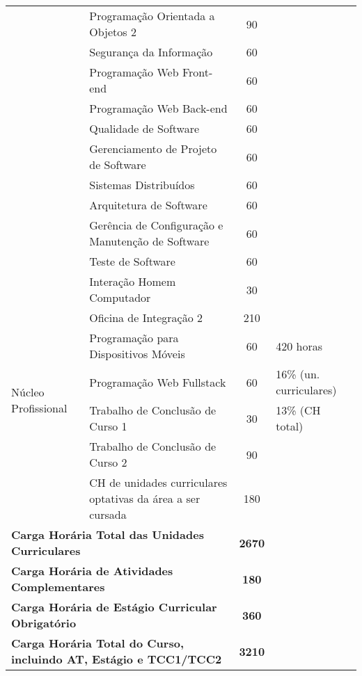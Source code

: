 \begin{quadro}[ht!]
\begin{tabular}{|l|l|c|p{3.2cm}|}
\cline{2-3} & Programação Orientada a Objetos 2 & 90 & \\
\cline{2-3} & Segurança da Informação & 60 & \\
\cline{2-3} & Programação Web Front-end & 60 & \\
\cline{2-3} & Programação Web Back-end & 60 & \\
\cline{2-3} & Qualidade de Software & 60 & \\
\cline{2-3} & Gerenciamento de Projeto de Software & 60 & \\
\cline{2-3} & Sistemas Distribuídos & 60 & \\
\cline{2-3} & Arquitetura de Software & 60 & \\
\cline{2-3} & Gerência de Configuração e Manutenção de Software & 60 & \\
\cline{2-3} & Teste de Software  & 60 & \\
\cline{2-3} & Interação Homem Computador & 30 & \\
\cline{2-3} & Oficina de Integração 2 & 210 & \\
\hline
\multirow{4}{*}{Núcleo Profissional} & Programação para Dispositivos Móveis & 60 & 420 horas  \\
\cline-1 & Programação Web Fullstack & 60 & 16\% (un. curriculares)\\
\cline-1 & Trabalho de Conclusão de Curso 1 & 30 & 13\% (CH total)\\
\cline{2-3} & Trabalho de Conclusão de Curso 2 & 90 & \\
\cline{2-3} & CH de unidades curriculares optativas da área a ser cursada & 180 & \\
\hline
\multicolumn{2}{|l|}{\textbf{Carga Horária Total das Unidades Curriculares}} & \textbf{2670} &  \\\hline
\multicolumn{2}{|l|}{\textbf{Carga Horária de Atividades Complementares}} & \textbf{180} &  \\\hline
\multicolumn{2}{|l|}{\textbf{Carga Horária de Estágio Curricular Obrigatório}} & \textbf{360} &  \\\hline
\multicolumn{2}{|l|}{\textbf{Carga Horária Total do Curso, incluindo AT, Estágio e TCC1/TCC2}} & \textbf{3210} & \\\hline
\end{tabular}
\end{quadro}
